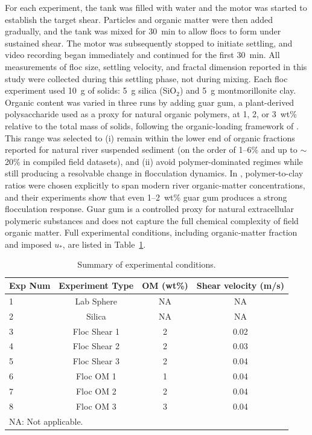 \documentclass{agujournal2019}
\begin{document}
For each experiment, the tank was filled with water and the motor was started to establish the target shear. Particles and organic matter were then added gradually, and the tank was mixed for 30~min to allow flocs to form under sustained shear. The motor was subsequently stopped to initiate settling, and video recording began immediately and continued for the first 30~min. All measurements of floc size, settling velocity, and fractal dimension reported in this study were collected during this settling phase, not during mixing. Each floc experiment used 10~g of solids: 5~g silica (SiO$_2$) and 5~g montmorillonite clay. Organic content was varied in three runs by adding guar gum, a plant-derived polysaccharide used as a proxy for natural organic polymers, at 1, 2, or 3~wt\% relative to the total mass of solids, following the organic-loading framework of . This range was selected to (i) remain within the lower end of organic fractions reported for natural river suspended sediment (on the order of 1--6\% and up to \(\sim\)20\% in compiled field datasets), and (ii) avoid polymer-dominated regimes while still producing a resolvable change in flocculation dynamics. In , polymer-to-clay ratios were chosen explicitly to span modern river organic-matter concentrations, and their experiments show that even 1--2~wt\% guar gum produces a strong flocculation response. Guar gum is a controlled proxy for natural extracellular polymeric substances and does not capture the full chemical complexity of field organic matter. Full experimental conditions, including organic-matter fraction and imposed $u_*$, are listed in Table~\ref{tab:exp_conditions}.

\begin{table}[htbp]
\caption{Summary of experimental conditions.\label{tab:exp_conditions}}
\centering
\begin{tabular}{lccc}
\hline
Exp Num & Experiment Type & OM (wt\%) & Shear velocity (m/s) \\
\hline
1 & Lab Sphere     & NA    & NA    \\
2 & Silica         & NA    & NA    \\
3 & Floc Shear 1   & 2     & 0.02  \\
4 & Floc Shear 2   & 2     & 0.03  \\
5 & Floc Shear 3   & 2     & 0.04  \\
6 & Floc OM 1     & 1     & 0.04  \\
7 & Floc OM 2     & 2     & 0.04  \\
8 & Floc OM 3     & 3     & 0.04  \\
\hline
\multicolumn{4}{l}{NA: Not applicable.}
\end{tabular}
\end{table}
\end{document}
